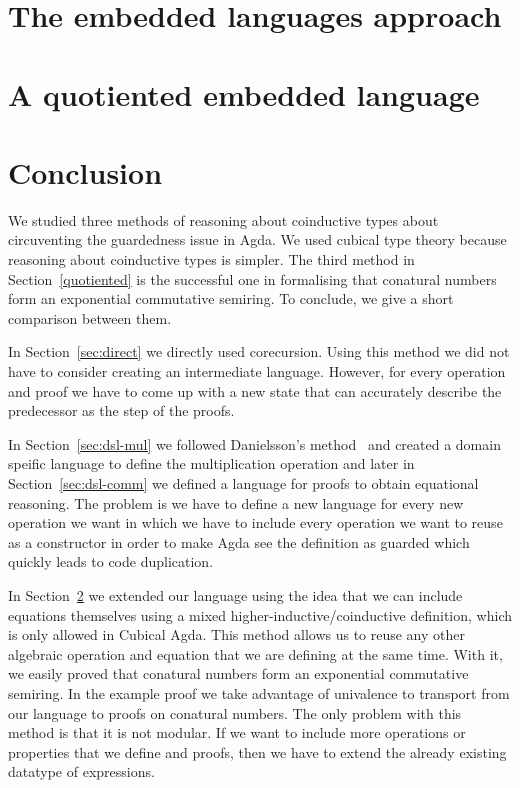 \documentclass[sigplan, screen, natbib=false, review]{acmart}
\begin{document}

\section{The embedded languages approach}\label{sec:dsl}



\section{A quotiented embedded language}\label{sec:quotiented}



\section{Conclusion}

We studied three methods of reasoning about coinductive types
about circuventing the guardedness issue in Agda.
We used cubical type theory because reasoning about coinductive
types is simpler. The third method in Section~\ref{quotiented} is the successful
one in formalising that conatural numbers form an exponential
commutative semiring. To conclude, we give a short comparison between
them.

In Section~\ref{sec:direct} we directly used corecursion. Using this method we
did not have to consider creating an intermediate language. However, for every
operation and proof we have to come up with a new state that can accurately
describe the predecessor as the step of the proofs.

In Section~\ref{sec:dsl-mul} we followed Danielsson's
method~\cite{danielsson-beating} and created a domain speific language to define
the multiplication operation and later in Section~\ref{sec:dsl-comm} we defined
a language for proofs to obtain equational reasoning. The problem is we have to
define a new language for every new operation we want in which we have to
include every operation we want to reuse as a constructor in order to make Agda
see the definition as guarded which quickly leads to code duplication.

In Section~\ref{sec:quotiented} we extended our language using the idea that we
can include equations themselves using a mixed higher-inductive/coinductive
definition, which is only allowed in Cubical Agda. This method allows us to
reuse any other algebraic operation and equation that we are defining at the
same time. With it, we easily proved that conatural numbers form an exponential
commutative semiring. In the example proof we take advantage of
univalence to transport from our language to proofs on conatural numbers.
The only problem with this method is that it is not
modular. If we want to include more operations or properties that we define and
proofs, then we have to extend the already existing datatype of expressions.
\end{document}
